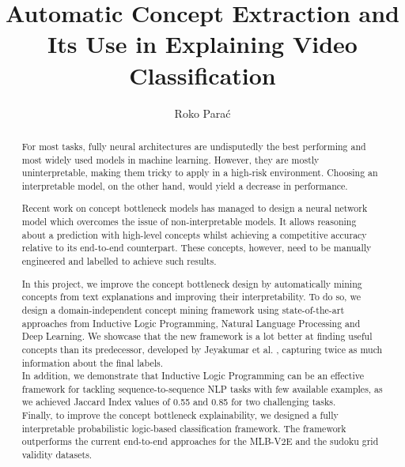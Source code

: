 \documentclass[a4paper, twoside, 12pt]{report}
\title{Automatic Concept Extraction and Its Use in Explaining Video Classification}
\author{Roko Parać}
\theoremstyle{definition} %
\begin{document}
\renewcommand{\vec}[1]{\textbf{#1}}
\newcommand{\curly}[1]{\mathcal{#1}}
\newcommand{\expct}{\mathbb{E}}
\newcommand{\reals}{\mathbb{R}}





\begin{abstract}
For most tasks, fully neural architectures are undisputedly the best performing and most widely used models in machine learning.
However, they are mostly uninterpretable, making them tricky to apply in a high-risk environment.
Choosing an interpretable model, on the other hand, would yield a decrease in performance.

Recent work on concept bottleneck models \cite{RefWorks:RefID:35-koh2020concept} has managed to design a neural network model which overcomes the issue of non-interpretable models.
It allows reasoning about a prediction with high-level concepts whilst achieving a competitive accuracy relative to its end-to-end counterpart.
These concepts, however, need to be manually engineered and labelled to achieve such results.

In this project, we improve the concept bottleneck design by automatically mining concepts from text explanations and improving their interpretability.
To do so, we design a domain-independent concept mining framework using state-of-the-art approaches from Inductive Logic Programming, Natural Language Processing and Deep Learning.
We showcase that the new framework is a lot better at finding useful concepts than its predecessor, developed by Jeyakumar et al. \cite{RefWorks:RefID:16-2021automatic}, capturing twice as much information about the final labels.\\
In addition, we demonstrate that Inductive Logic Programming can be an effective framework for tackling sequence-to-sequence NLP tasks with few available examples, as we achieved Jaccard Index values of 0.55 and 0.85 for two challenging tasks. \\
Finally, to improve the concept bottleneck explainability, we designed a fully interpretable probabilistic logic-based classification framework. The framework outperforms the current end-to-end approaches for the MLB-V2E and the sudoku grid validity datasets.

\end{abstract}
\end{document}
